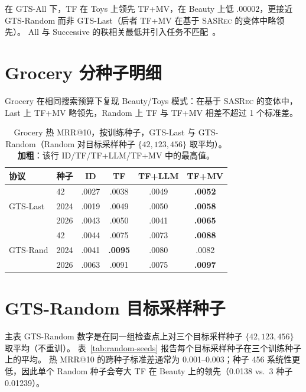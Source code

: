 \documentclass[sigconf,natbib=true,anonymous]{acmart}
\newcommand{\tfmv}{\textsc{TF+MV}\xspace}
\newcommand{\base}{\textsc{SASRec}\xspace}
\begin{document}
在 GTS-All 下，TF 在 Toys 上领先 \tfmv，在 Beauty 上低 $.00002$，更接近 GTS-Random 而非 GTS-Last（后者 \tfmv 在基于 \base 的变体中略领先）。
All 与 Successive 的秩相关最低并引入任务不匹配~\cite{gusak2025time}。

\section{Grocery 分种子明细}
\label{app:grocery}

Grocery 在相同搜索预算下复现 Beauty/Toys 模式：在基于 \base 的变体中，Last 上 \tfmv 略领先，Random 上 TF 与 \tfmv 相差不超过 1 个标准差。

\begin{table}[H]
\centering
\caption{Grocery 热 MRR@10，按训练种子，GTS-Last 与 GTS-Random（Random 对目标采样种子 $\{42,123,456\}$ 取平均）。
\textbf{加粗}：该行 ID/TF/TF+LLM/TF+MV 中的最高值。}
\label{tab:grocery-perseed}
\small
\setlength{\tabcolsep}{3pt}
\begin{tabular}{@{}llcccc@{}}
\toprule
协议 & 种子 & ID & TF & TF+LLM & TF+MV \\
\midrule
\multirow{3}{*}{GTS-Last}
 & 42    & .0027 & .0038 & .0049 & \textbf{.0052} \\
 & 2024  & .0019 & .0049 & .0050 & \textbf{.0058} \\
 & 2026  & .0043 & .0050 & .0041 & \textbf{.0065} \\
\midrule
\multirow{3}{*}{GTS-Rand}
 & 42    & .0044 & .0075 & .0073 & \textbf{.0088} \\
 & 2024  & .0041 & \textbf{.0095} & .0080 & .0082 \\
 & 2026  & .0063 & .0091 & .0075 & \textbf{.0097} \\
\bottomrule
\end{tabular}
\end{table}

\section{GTS-Random 目标采样种子}
\label{app:random-seeds}

主表 GTS-Random 数字是在同一组检查点上对三个目标采样种子 $\{42,123,456\}$ 取平均（不重训）。
表~\ref{tab:random-seeds} 报告每个目标采样种子在三个训练种子上的平均。
热 MRR@10 的跨种子标准差通常为 0.001--0.003；种子 456 系统性更低，因此单个 Random 种子会夸大 TF 在 Beauty 上的领先（0.0138 vs.\ 3 种子 0.01239）。
\end{document}
